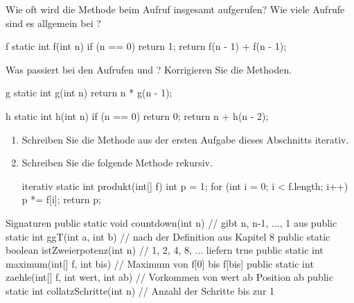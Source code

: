 Wie oft wird die Methode  beim Aufruf  insgesamt aufgerufen? Wie viele Aufrufe sind es allgemein bei ?
\begin{javacode}[Ausschnitt]{f}
static int f(int n) {
	if (n == 0) return 1;
	return f(n - 1) + f(n - 1);
}
\end{javacode}

Was passiert bei den Aufrufen  und ? Korrigieren Sie die Methoden.
\begin{tcbraster}[raster columns=2, raster equal height=rows, raster column skip=3mm]
\begin{javacode}[Ausschnitt]{g}
static int g(int n) {
	return n * g(n - 1);
}
\end{javacode}
\begin{javacode}[Ausschnitt]{h}
static int h(int n) {
	if (n == 0) return 0;
	return n + h(n - 2);
}
\end{javacode}
\end{tcbraster}

\begin{enumerate}[label=\alph*)]
\item Schreiben Sie die Methode  aus der ersten Aufgabe dieses Abschnitts iterativ.
\item Schreiben Sie die folgende Methode rekursiv.
\begin{javacode}[Ausschnitt]{iterativ}
static int produkt(int[] f) {
	int p = 1;
	for (int i = 0; i < f.length; i++) {
		p *= f[i];
	}
	return p;
}
\end{javacode}
\end{enumerate}

\begin{javacode}[Ausschnitt]{Signaturen}
public static void countdown(int n)                     // gibt n, n-1, ..., 1 aus
public static int ggT(int a, int b)                     // nach der Definition aus Kapitel 8
public static boolean istZweierpotenz(int n)            // 1, 2, 4, 8, ... liefern true
public static int maximum(int[] f, int bis)             // Maximum von f[0] bis f[bis]
public static int zaehle(int[] f, int wert, int ab)     // Vorkommen von wert ab Position ab
public static int collatzSchritte(int n)                // Anzahl der Schritte bis zur 1
\end{javacode}

